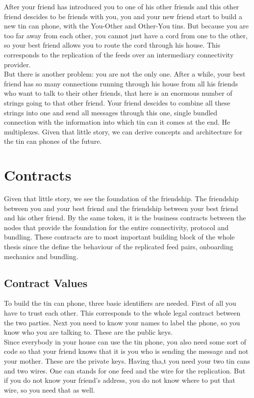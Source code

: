 After your friend has introduced you to one of his other friends and this other friend descides to be friends with you, you and your new friend start to build a new tin can phone, with the You-Other and Other-You tins. But because you are too far away from each other, you cannot just have a cord from one to the other, so your best friend allows you to route the cord through his house. This corresponds to the replication of the feeds over an intermediary connectivity provider.\\

But there is another problem: you are not the only one. After a while, your best friend has so many connections running through his house from all his friends who want to talk to their other friends, that here is an enormous number of strings going to that other friend. Your friend descides to combine all these strings into one and send all messages through this one, single bundled connection with the information into which tin can it comes at the end. He multiplexes. Given that little story, we can derive concepts and architecture for the tin can phones of the future. 
\section{Contracts}
Given that little story, we see the foundation of the friendship. The friendship between you and your best friend and the friendship between your best friend and his other friend. By the same token, it is the business contracts between the nodes that provide the foundation for the entire connectivity, protocol and bundling. These contracts are to most important building block of the whole thesis since the define the behaviour of the replicated feed pairs,  onboarding mechanics and bundling.

\subsection{Contract Values}
To build the tin can phone, three basic identifiers are needed. First of all you have to trust each other. This corresponds to the whole legal contract between the two parties. Next you need to know your names to label the phone, so you know who you are talking to. These are the public keys. \\

Since everybody in your house can use the tin phone, you also need some sort of code so that your friend knows that it is you who is sending the message and not your mother. These are the private keys. Having tha,t you need your two tin cans and two wires. One can stands for one feed and the wire for the replication. But if you do not know your friend’s address, you do not know where to put that wire, so you need that as well. 

